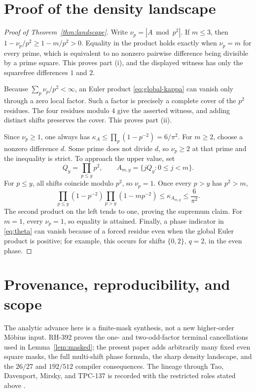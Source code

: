 \documentclass[11pt]{article}
\theoremstyle{definition}
\theoremstyle{remark}
\newcommand{\kap}{\kappa}
\begin{document}
\section{Proof of the density landscape}

\begin{proof}[Proof of Theorem~\ref{thm:landscape}]
Write \(\nu_p=|A\bmod p^2|\).  If \(m\le3\), then
\(1-\nu_p/p^2\ge1-m/p^2>0\).  Equality in the product holds exactly when
\(\nu_p=m\) for every prime, which is equivalent to no nonzero pairwise
difference being divisible by a prime square.  This proves part (i), and
the displayed witness has only the squarefree differences \(1\) and \(2\).

Because \(\sum_p\nu_p/p^2<\infty\), an Euler product \eqref{eq:global-kappa}
can vanish only through a zero local factor.  Such a factor is precisely a
complete cover of the \(p^2\) residues.  The four residues modulo \(4\)
give the asserted witness, and adding distinct shifts preserves the cover.
This proves part (ii).

Since \(\nu_p\ge1\), one always has
\(\kap_A\le\prod_p(1-p^{-2})=6/\pi^2\).  For \(m\ge2\), choose a nonzero
difference \(d\).  Some prime does not divide \(d\), so \(\nu_p\ge2\) at
that prime and the inequality is strict.  To approach the upper value, set
\[
 Q_y=\prod_{p\le y}p^2,\qquad A_{m,y}=\{jQ_y:0\le j<m\}.
\]
For \(p\le y\), all shifts coincide modulo \(p^2\), so \(\nu_p=1\).
Once every \(p>y\) has \(p^2>m\),
\[
 \prod_{p\le y}(1-p^{-2})\prod_{p>y}(1-mp^{-2})
 \le\kap_{A_{m,y}}\le\frac6{\pi^2}.
\]
The second product on the left tends to one, proving the supremum claim.
For \(m=1\), every \(\nu_p=1\), so equality is attained.  Finally, a
phase indicator in \eqref{eq:theta} can vanish because of a forced residue
even when the global Euler product is positive; for example, this occurs
for shifts \(\{0,2\}\), \(q=2\), in the even phase.
\end{proof}

\section{Provenance, reproducibility, and scope}

The analytic advance here is a finite-mask synthesis, not a new
higher-order M\"obius input.  RH-392 proves the one- and two-odd-factor
terminal cancellations used in Lemma~\ref{lem:masked}; the present paper
adds arbitrarily many fixed even square masks, the full multi-shift phase
formula, the sharp density landscape, and the \(26/27\) and \(192/512\)
compiler consequences.  The lineage through Tao, Davenport, Mirsky, and
TPC-137 is recorded with the restricted roles stated above
\cite{Tao2016LogChowla,Davenport1937,Mirsky1948,TPC137}.
\end{document}
